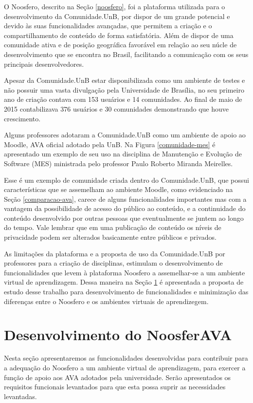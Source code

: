 O Noosfero, descrito na Seção \ref{noosfero}, foi a plataforma utilizada para o desenvolvimento da Comunidade.UnB, por dispor de um grande potencial e devido às suas funcionalidades avançadas, que permitem a criação e o compartilhamento de conteúdo de forma satisfatória. Além de dispor de uma comunidade ativa e de posição geográfica favorável em relação ao seu núcle de desenvolvimento que se encontra no Brasil, facilitando a comunicação com os seus principais desenvolvedores.

Apesar da Comunidade.UnB estar disponibilizada como um ambiente de testes e não possuir uma vasta divulgação pela Universidade de Brasília, no seu primeiro ano de criação contava com 153 usuários e 14 comunidades. Ao final de maio de 2015 contabilizava 376 usuários e 30 comunidades demonstrando que houve crescimento.

Alguns professores adotaram a Comunidade.UnB como um ambiente de apoio ao Moodle, AVA oficial adotado pela UnB. Na Figura \ref{comunidade-mes} é apresentado um exemplo de seu uso na disciplina de Manutenção e Evolução de Software (MES) ministrada pelo professor Paulo Roberto Miranda Meirelles.

Esse é um exemplo de comunidade criada dentro do Comunidade.UnB, que possui características que se assemelham ao ambiente Moodle, como evidenciado na Seção \ref{comparacao-ava}, carece de alguns funcionalidades importantes mas com a vantagem da possibilidade de acesso do público ao conteúdo, e a continuidade do conteúdo desenvolvido por outras pessoas que eventualmente se juntem ao longo do tempo. Vale lembrar que em uma publicação de conteúdo os níveis de privacidade podem ser alterados basicamente entre públicos e privados.

As limitações da plataforma e a proposta de uso da Comunidade.UnB por professores para a criação de disciplinas, estimulam o desenvolvimento de funcionalidades que levem à plataforma Noosfero a assemelhar-se a um ambiente virtual de aprendizagem. Dessa maneira na Seção \ref{desen-noosferAVA} é apresentada a proposta de estudo desse trabalho para desenvolvimento de funcionalidades e minimização das diferenças entre o Noosfero e os ambientes virtuais de aprendizegem.

\chapter{Desenvolvimento do NoosferAVA}
\label{desen-noosferAVA}

Nesta seção apresentaremos as funcionalidades desenvolvidas para contribuir para a adequação do Noosfero a um ambiente virtual de aprendizagem, para exercer a função de apoio aos AVA adotados pela universidade. Serão apresentados os requisitos funcionais levantados para que esta possa suprir as necessidades levantadas.

